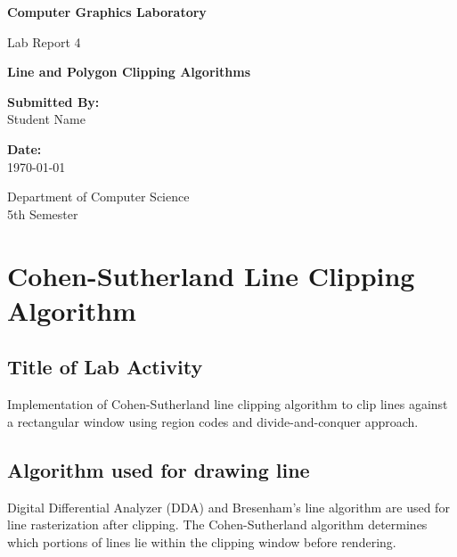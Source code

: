 \documentclass[12pt,a4paper]{article}
\begin{document}
\begin{titlepage}
    \centering
    \vspace*{1cm}
    
    \Huge
    \textbf{Computer Graphics Laboratory}
    
    \vspace{0.5cm}
    \LARGE
    Lab Report 4
    
    \vspace{1.5cm}
    
    \Large
    \textbf{Line and Polygon Clipping Algorithms}
    
    \vspace{2cm}
    
    \textbf{Submitted By:}\\
    \vspace{0.3cm}
    \Large
    Student Name
    
    \vspace{2cm}
    
    \textbf{Date:}\\
    \vspace{0.3cm}
    \today
    
    \vfill
    
    \large
    Department of Computer Science\\
    5th Semester
    
\end{titlepage}

\tableofcontents
\newpage

\section{Cohen-Sutherland Line Clipping Algorithm}

\subsection{Title of Lab Activity}
Implementation of Cohen-Sutherland line clipping algorithm to clip lines against a rectangular window using region codes and divide-and-conquer approach.

\subsection{Algorithm used for drawing line}
Digital Differential Analyzer (DDA) and Bresenham's line algorithm are used for line rasterization after clipping. The Cohen-Sutherland algorithm determines which portions of lines lie within the clipping window before rendering.
\end{document}
